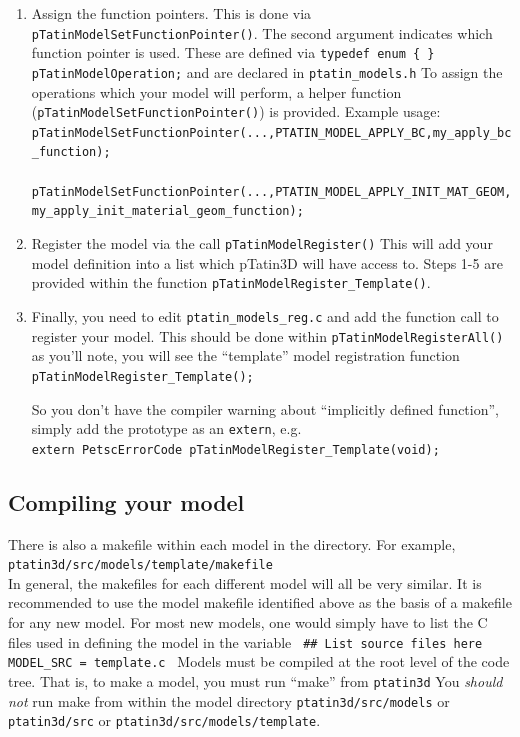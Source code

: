 \documentclass[paper=a4, fontsize=11pt,twoside]{scrartcl}
\newcommand{\ptat}{{{\sc pTatin3D}}}
\newcommand{\shellcmd}[1]{\\\indent\indent\texttt{\hspace{5mm}\footnotesize #1}\\}
\newcommand{\unix}[1]{\texttt{\footnotesize #1}}
\begin{document}
{{\begin{enumerate}
	\item Assign the function pointers. This is done via \unix{pTatinModelSetFunctionPointer()}.
The second argument indicates which function pointer is used. These are defined via
\unix{typedef enum \{ \} pTatinModelOperation;}
and are declared in 
\unix{ptatin\_models.h}
To assign the operations which your model will perform, a helper function (\unix{pTatinModelSetFunctionPointer()}) is provided.
Example usage:
\shellcmd{pTatinModelSetFunctionPointer(...,PTATIN\_MODEL\_APPLY\_BC,my\_apply\_bc\_function);}
\shellcmd{pTatinModelSetFunctionPointer(...,PTATIN\_MODEL\_APPLY\_INIT\_MAT\_GEOM,my\_apply\_init\_material\_geom\_function);} %

	\item Register the model via the call
\unix{pTatinModelRegister()}
This will add your model definition into a list which {\ptat} will have access to.
Steps 1-5 are provided within the function \unix{pTatinModelRegister\_Template()}.

	\item Finally, you need to edit
	\unix{ptatin\_models\_reg.c}
and add the function call to register your model.
This should be done within
		\unix{pTatinModelRegisterAll()}
as you'll note, you will see the ``template'' model registration function 	
		\unix{pTatinModelRegister\_Template();}

So you don't have the compiler warning about ``implicitly defined function'', simply add the prototype as an \unix{extern}, e.g.
	\shellcmd{extern PetscErrorCode pTatinModelRegister\_Template(void);}
\end{enumerate}

\subsection{Compiling your model}
There is also a makefile within each model in the directory.
For example,
	\shellcmd{ptatin3d/src/models/template/makefile}
In general, the makefiles for each different model will all be very similar.
It is recommended to use the model makefile identified above as the basis of a makefile for any new model.
For most new models, one would simply have to list the C files used in defining the model in the variable
\newline
\unix{
\#\# List source files here \newline
MODEL\_SRC = \newline
        template.c \newline
}
Models must be compiled at the root level of the code tree.
That is, to make a model, you must run ``make'' from 
	\unix{ptatin3d}
You \textit{should not} run make from within the model directory
	\unix{ptatin3d/src/models}
or
	\unix{ptatin3d/src}
or
	\unix{ptatin3d/src/models/template}.

}}
\end{document}
